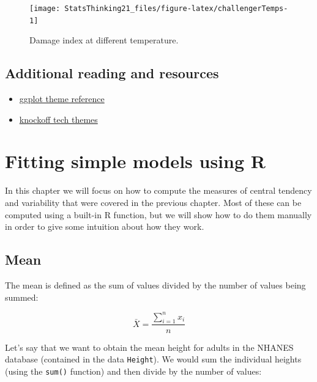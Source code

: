 \documentclass[
  12pt,
]{book}
\newenvironment{Shaded}{\begin{snugshade}}{\end{snugshade}}
\newcommand{\FunctionTok}[1]{\textcolor[rgb]{0.13,0.29,0.53}{\textbf{#1}}}
\newcommand{\NormalTok}[1]{#1}
\newcommand{\SpecialCharTok}[1]{\textcolor[rgb]{0.81,0.36,0.00}{\textbf{#1}}}
\begin{document}
\begin{figure}
\texttt{[image: StatsThinking21\_files/figure-latex/challengerTemps-1]} \caption{Damage index at different temperature.}\label{fig:challengerTemps}
\end{figure}

\hypertarget{additional-reading-and-resources}{%
\section{Additional reading and resources}\label{additional-reading-and-resources}}

\begin{itemize}
\item
  \href{http://ggplot2.tidyverse.org/reference/ggtheme.html}{ggplot theme reference}
\item
  \href{https://exts.ggplot2.tidyverse.org/}{knockoff tech themes}
\end{itemize}

\hypertarget{fitting-simple-models-using-r}{%
\chapter{Fitting simple models using R}\label{fitting-simple-models-using-r}}

In this chapter we will focus on how to compute the measures of central tendency and variability that were covered in the previous chapter. Most of these can be computed using a built-in R function, but we will show how to do them manually in order to give some intuition about how they work.

\hypertarget{mean}{%
\section{Mean}\label{mean}}

The mean is defined as the sum of values divided by the number of values being summed:

\[
\bar{X} = \frac{\sum_{i=1}^{n}x_i}{n}
\]

Let's say that we want to obtain the mean height for adults in the NHANES database (contained in the data \texttt{Height}). We would sum the individual heights (using the \texttt{sum()} function) and then divide by the number of values:

\begin{Shaded}
\end{Shaded}
\end{document}
